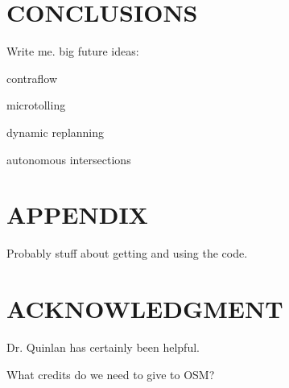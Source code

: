 \documentclass[letterpaper, 10 pt, conference]{ieeeconf}  %
\begin{document}


\section{CONCLUSIONS}

Write me. big future ideas:

contraflow

microtolling

dynamic replanning

autonomous intersections

\addtolength{\textheight}{-12cm}  %


\section*{APPENDIX}

Probably stuff about getting and using the code.

\section*{ACKNOWLEDGMENT}

Dr. Quinlan has certainly been helpful.

What credits do we need to give to OSM?








\end{document}
